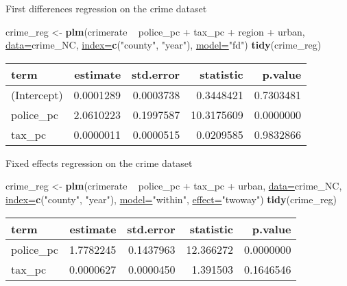 \documentclass[ignorenonframetext,]{beamer}
\newenvironment{Shaded}{\begin{snugshade}}{\end{snugshade}}
\newcommand{\KeywordTok}[1]{\textcolor[rgb]{0.26,0.66,0.93}{\textbf{#1}}}
\newcommand{\DataTypeTok}[1]{\textcolor[rgb]{0.74,0.68,0.62}{\underline{#1}}}
\newcommand{\StringTok}[1]{\textcolor[rgb]{0.02,0.61,0.04}{#1}}
\newcommand{\OperatorTok}[1]{\textcolor[rgb]{0.74,0.68,0.62}{#1}}
\newcommand{\NormalTok}[1]{\textcolor[rgb]{0.74,0.68,0.62}{#1}}
\begin{document}
\begin{frame}[fragile]{First differences regression on the crime
dataset}

\begin{Shaded}
\begin{Highlighting}[]
\NormalTok{crime_reg <-}\StringTok{ }\KeywordTok{plm}\NormalTok{(crimerate }\OperatorTok{~}\StringTok{ }\NormalTok{police_pc }\OperatorTok{+}\StringTok{ }\NormalTok{tax_pc }\OperatorTok{+}
\StringTok{                }\NormalTok{region }\OperatorTok{+}\StringTok{ }\NormalTok{urban, }\DataTypeTok{data=}\NormalTok{crime_NC, }
                \DataTypeTok{index=}\KeywordTok{c}\NormalTok{(}\StringTok{"county"}\NormalTok{, }\StringTok{"year"}\NormalTok{), }\DataTypeTok{model=}\StringTok{"fd"}\NormalTok{)}
\KeywordTok{tidy}\NormalTok{(crime_reg)}
\end{Highlighting}
\end{Shaded}

\begin{longtable}[]{@{}lrrrr@{}}
\toprule
term & estimate & std.error & statistic & p.value\tabularnewline
\midrule
\endhead
(Intercept) & 0.0001289 & 0.0003738 & 0.3448421 &
0.7303481\tabularnewline
police\_pc & 2.0610223 & 0.1997587 & 10.3175609 &
0.0000000\tabularnewline
tax\_pc & 0.0000011 & 0.0000515 & 0.0209585 & 0.9832866\tabularnewline
\bottomrule
\end{longtable}

\end{frame}

\begin{frame}[fragile]{Fixed effects regression on the crime dataset}

\begin{Shaded}
\begin{Highlighting}[]
\NormalTok{crime_reg <-}\StringTok{ }\KeywordTok{plm}\NormalTok{(crimerate }\OperatorTok{~}\StringTok{ }\NormalTok{police_pc }\OperatorTok{+}\StringTok{ }
\StringTok{                }\NormalTok{tax_pc }\OperatorTok{+}\StringTok{ }\NormalTok{urban, }\DataTypeTok{data=}\NormalTok{crime_NC, }
                \DataTypeTok{index=}\KeywordTok{c}\NormalTok{(}\StringTok{"county"}\NormalTok{, }\StringTok{"year"}\NormalTok{), }
                \DataTypeTok{model=}\StringTok{"within"}\NormalTok{, }\DataTypeTok{effect=}\StringTok{"twoway"}\NormalTok{)}
\KeywordTok{tidy}\NormalTok{(crime_reg)}
\end{Highlighting}
\end{Shaded}

\begin{longtable}[]{@{}lrrrr@{}}
\toprule
term & estimate & std.error & statistic & p.value\tabularnewline
\midrule
\endhead
police\_pc & 1.7782245 & 0.1437963 & 12.366272 &
0.0000000\tabularnewline
tax\_pc & 0.0000627 & 0.0000450 & 1.391503 & 0.1646546\tabularnewline
\bottomrule
\end{longtable}

\end{frame}
\end{document}

